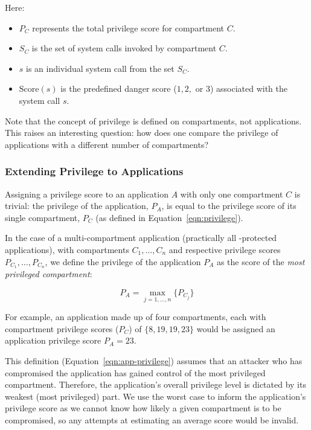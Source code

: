 Here:
\begin{itemize}
    \item $P_C$ represents the total privilege score for compartment $C$.
    \item $S_C$ is the set of system calls invoked by compartment $C$.
    \item $s$ is an individual system call from the set $S_C$.
    \item $\mathrm{Score}(s)$ is the predefined danger score ($1, 2,$ or $3$)
        associated with the system call $s$.
\end{itemize}

Note that the concept of privilege is defined on compartments, not applications.
This raises an interesting question: how does one compare the privilege of
applications with a different number of compartments?

\subsubsection{Extending Privilege to Applications}\label{subsubsec:eval-quant-priv-apps}

Assigning a privilege score to an application $A$ with only one compartment $C
$ is trivial: the privilege of the application, $P_A$, is equal to the
privilege score of its single compartment, $P_C$ (as defined in 
Equation~\ref{eqn:privilege}). 

In the case of a multi-compartment application (practically all \af-protected
applications), with compartments $C_1, \dots, C_n$ and respective
privilege scores $P_{C_1}, \dots, P_{C_n}$, we define the privilege of the
application $P_A$ as the score of the \textit{most privileged compartment}: 

\begin{equation} \label{eqn:app-privilege} 
    P_A = \max_{j=1,\dots,n} \{ P_{C_j} \} 
\end{equation} 

For example, an application made up of four compartments, each
with compartment privilege scores ($P_C$) of $\{8, 19, 19, 23\}$ would be
assigned an application privilege score $P_A = 23$.

This definition (Equation~\ref{eqn:app-privilege}) assumes that an attacker who
has compromised the application has gained control of the most privileged
compartment. Therefore, the application's overall privilege level is
dictated by its weakest (most privileged) part. We use the worst case to
inform the application's privilege score as we cannot know how
likely a given compartment is to be compromised, so any attempts at
estimating an average score would be invalid. 

